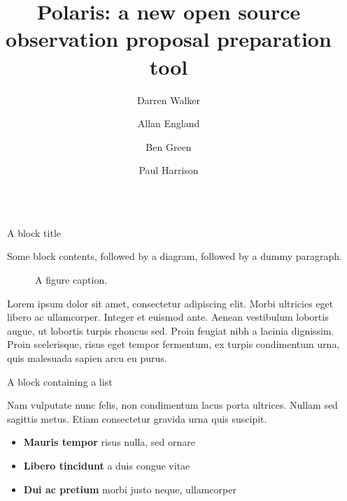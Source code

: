 \documentclass[final]{beamer}
\title{Polaris: a new open source observation proposal preparation tool}
\author{Darren Walker \and Allan England \and Ben Green \and Paul Harrison}
\institute[shortinst]{JCBA, The University of Manchester, UK}
\newlength{\sepwidth}
\newlength{\colwidth}
\newcommand{\separatorcolumn}{\begin{column}{\sepwidth}\end{column}}
\begin{document}
    \begin{frame}[t]
        \begin{columns}[t]
            \separatorcolumn

            \begin{column}{\colwidth}

                \begin{block}{A block title}

                    Some block contents, followed by a diagram, followed by a dummy paragraph.

                    \begin{figure}
                        \centering
                        \caption{A figure caption.}
                    \end{figure}

                    Lorem ipsum dolor sit amet, consectetur adipiscing elit. Morbi ultricies
                    eget libero ac ullamcorper. Integer et euismod ante. Aenean vestibulum
                    lobortis augue, ut lobortis turpis rhoncus sed. Proin feugiat nibh a
                    lacinia dignissim. Proin scelerisque, risus eget tempor fermentum, ex
                    turpis condimentum urna, quis malesuada sapien arcu eu purus.

                \end{block}

                \begin{block}{A block containing a list}

                    Nam vulputate nunc felis, non condimentum lacus porta ultrices. Nullam sed
                    sagittis metus. Etiam consectetur gravida urna quis suscipit.

                    \begin{itemize}
                        \item \textbf{Mauris tempor} risus nulla, sed ornare
                        \item \textbf{Libero tincidunt} a duis congue vitae
                        \item \textbf{Dui ac pretium} morbi justo neque, ullamcorper
                    \end{itemize}


\end{block}
\end{column}
\end{columns}
\end{frame}
\end{document}
